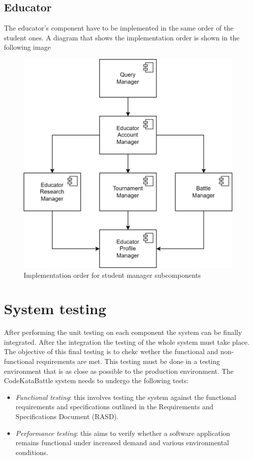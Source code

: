 \documentclass[12pt, a4paper]{report}
\begin{document}
    \subsection{Educator}
    The educator's component have to be implemented in the same order of the student ones. 
    A diagram that shows the implementation order is shown in the following image
    \begin{figure}[H]
        \centering
        \includegraphics[width=0.5\linewidth]{images/educator_impl.png}
        \caption{Implementation order for student manager subcomponents}
    \end{figure}



    \section{System testing}
    After performing the unit testing on each component the system can be finally integrated. 
    After the integration the testing of the whole system must take place. 
    The objective of this final testing is to chekc wether the functional and non-functional requirements are met. 
    This testing must be done in a testing environment that is as close as possible to the production environment.
    The CodeKataBattle system needs to undergo the following tests: 
    \begin{itemize}
        \item \textit{Functional testing}: this involves testing the system against the functional requirements and specifications outlined in the Requirements and Specifications Document (RASD).
        \item \textit{Performance testing}: this aims to verify whether a software application remains functional under increased demand and various environmental conditions.
    \end{itemize}
\end{document}
